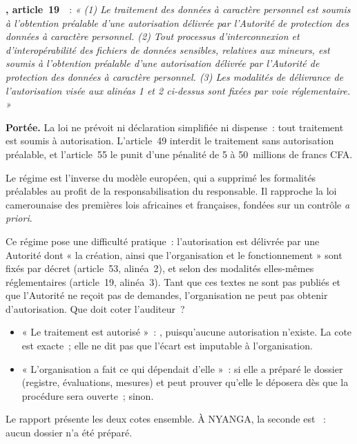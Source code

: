 \begin{boxjuris}
\textbf{, article~19}~\cite{loi2024017}~:
\textit{« (1) Le traitement des données à caractère personnel est soumis à
l'obtention préalable d'une autorisation délivrée par l'Autorité de
protection des données à caractère personnel. (2) Tout processus
d'interconnexion et d'interopérabilité des fichiers de données sensibles,
relatives aux mineurs, est soumis à l'obtention préalable d'une
autorisation délivrée par l'Autorité de protection des données à caractère
personnel. (3) Les modalités de délivrance de l'autorisation visée aux
alinéas 1 et 2 ci-dessus sont fixées par voie réglementaire. »}

\smallskip
\textbf{Portée.} La loi ne prévoit ni déclaration simplifiée ni dispense~:
tout traitement est soumis à autorisation. L'article~49 interdit le
traitement sans autorisation préalable, et l'article~55 le punit d'une
pénalité de 5 à 50~millions de francs CFA.
\end{boxjuris}

Le régime est l'inverse du modèle européen, qui a supprimé les formalités
préalables au profit de la responsabilisation du responsable. Il rapproche
la loi camerounaise des premières lois africaines et françaises, fondées
sur un contrôle \textit{a priori}.

Ce régime pose une difficulté pratique~: l'autorisation est délivrée par une
Autorité dont « la création, ainsi que l'organisation et le
fonctionnement » sont fixés par décret (article~53, alinéa~2), et selon des
modalités elles-mêmes réglementaires (article~19, alinéa~3). Tant que ces
textes ne sont pas publiés et que l'Autorité ne reçoit pas de demandes,
l'organisation ne peut pas obtenir d'autorisation. Que doit coter
l'auditeur~?

\begin{itemize}
    \item « Le traitement est autorisé »~: \NON{}, puisqu'aucune autorisation
          n'existe. La cote est exacte~; elle ne dit pas que l'écart est
          imputable à l'organisation.
    \item « L'organisation a fait ce qui dépendait d'elle »~: \OUI{} si elle
          a préparé le dossier (registre, évaluations, mesures) et peut
          prouver qu'elle le déposera dès que la procédure sera ouverte~;
          \NON{} sinon.
\end{itemize}

Le rapport présente les deux cotes ensemble. À NYANGA, la seconde est
\NON{}~: aucun dossier n'a été préparé.

